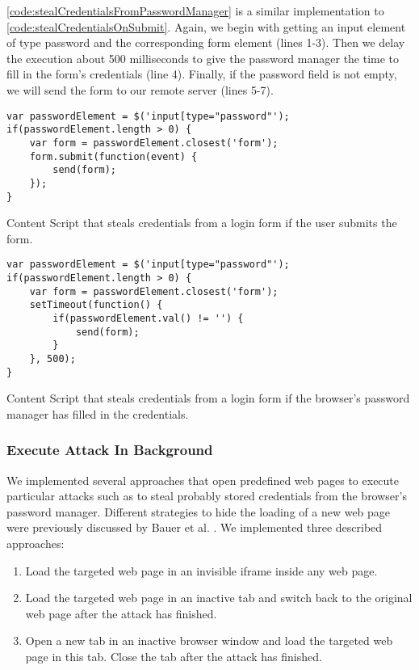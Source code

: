 	\autoref{code:stealCredentialsFromPasswordManager} is a similar implementation to \autoref{code:stealCredentialsOnSubmit}. Again, we begin with getting an input element of type password and the corresponding form element (lines 1-3). Then we delay the execution about 500 milliseconds to give the password manager the time to fill in the form's credentials (line 4). Finally, if the password field is not empty, we will send the form to our remote server (lines 5-7).
	
	\begin{code}
		\begin{lstlisting}	
var passwordElement = $('input[type="password"');
if(passwordElement.length > 0) {
	var form = passwordElement.closest('form');
	form.submit(function(event) {
		send(form);
	});
}
\end{lstlisting}
		\caption{Content Script that steals credentials from a login form if the user submits the form.}
		\label{code:stealCredentialsOnSubmit}
	\end{code}
	
	\begin{code}
		\begin{lstlisting}
var passwordElement = $('input[type="password"');
if(passwordElement.length > 0) {
	var form = passwordElement.closest('form');
	setTimeout(function() {
		if(passwordElement.val() != '') {
			send(form);
		}
	}, 500);
}
\end{lstlisting}
		\caption{Content Script that steals credentials from a login form if the browser's password manager has filled in the credentials.}
		\label{code:stealCredentialsFromPasswordManager}
	\end{code}
	
	
	
	
	
\subsubsection{Execute Attack In Background}

	We implemented several approaches that open predefined web pages to execute particular attacks such as to steal probably stored credentials from the browser's password manager. Different strategies to hide the loading of a new web page were previously discussed by Bauer et al. \cite{extensions:cns14}. We implemented three described approaches:
	
	\begin{enumerate}
		\item Load the targeted web page in an invisible iframe inside any web page.
		\item Load the targeted web page in an inactive tab and switch back to the original web page after the attack has finished.
		\item Open a new tab in an inactive browser window and load the targeted web page in this tab. Close the tab after the attack has finished.
	\end{enumerate} 
	
